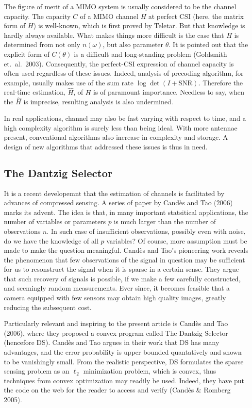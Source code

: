\documentclass[12pt]{article}
\begin{document}
The figure of merit of a MIMO system is usually considered to be the channel capacity.
The capacity \(C\) of a MIMO channel \(H\) at perfect CSI (here, the matrix form of \(H\)) is well-known, which is first proved by Teletar.
But that knowledge is hardly always available.
What makes things more difficult is the case that \(H\) is determined from not only \(n(\omega)\), but also parameter \(\theta\).
It is pointed out that the explicit form of \(C(\theta)\) is a difficult and long-standing problem (Goldsmith et.\ al.\ 2003).
Consequently, the perfect-CSI expression of channel capacity is often used regardless of these issues.
Indeed, analysis of precoding algorithm, for example, usually makes use of the sum rate \(\log \det (I +\mathrm{SNR})\).
Therefore the real-time estimation, \(\hat{H}\), of \(H\) is of paramount importance.
Needless to say, when the \(\hat{H}\) is imprecise, resulting analysis is also undermined.

In real applications, channel may also be fast varying with respect to time, and a high complexity algorithm is surely less than being ideal.
With more antennae present, conventional algorithms also increase in complexity and storage.
A design of new algorithms that addressed these issues is thus in need.

\subsection{The Dantzig Selector}

It is a recent developemnt that the estimation of channels is facilitated by advances of compressed sensing.
A series of paper by Cand\`es and Tao (2006) marks its advent.
The idea is that, in many important statsitical applications, the number of variables or parameters \(p\) is much larger than the number of observations \(n\).
In such case of insufficient observations, possibly even with noise, do we have the knowledge of all \(p\) variables?
Of course, more assumption must be made to make the question meaningful.
Cand\`es and Tao's pioneering work reveals the phenomenon that few observations of the signal in question may be sufficient for us to resonstruct the signal when it is sparse in a certain sense.
They argue that such recovery of signals is possible, if we make a few carefully constructed, and seemingly random measurements.
Ever since, it becomes feasible that a camera equipped with few sensors may obtain high quality images, greatly reducing the subsequent cost.

Particularly relevant and inspiring to the present article is Cand\`es and Tao (2006), where they proposed a convex program called The Dantzig Selector (hencefore DS).
Cand\`es and Tao argues in their work that DS has many advantages, and the error probability is upper bounded quantatively and shown to be vanishingly small.
From the realistic perspective, DS formulates the sparse sensing problem as an \(\ell_2\) minimization problem, which is convex, thus techniques from convex optimization may readily be used.
Indeed, they have put the code on the web for the reader to access and verify (Cand\`es \& Romberg 2005).
\end{document}
